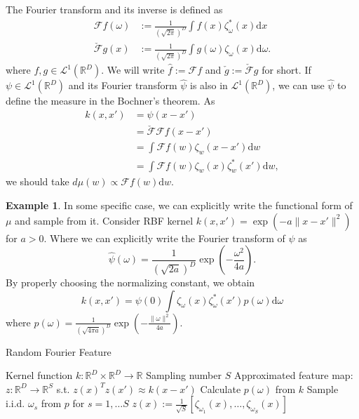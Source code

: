\documentclass{amsart}
\theoremstyle{definition}
\newtheorem{example}[theorem]{Example}
\theoremstyle{remark}
\numberwithin{equation}{section}
\begin{document}
The Fourier transform and its inverse is defined as
\begin{equation}
\begin{split}
\mathcal{F}f(\omega) &:= \frac{1}{(\sqrt{2\pi})^D}\int f(x) \zeta_\omega^{\ast}(x) \mathrm{d}x\\
\check{\mathcal{F}}g(x) &:= \frac{1}{(\sqrt{2\pi})^D}\int g(\omega) \zeta_\omega(x) \mathrm{d}\omega.
\end{split}
\end{equation}
where $f, g \in \mathcal{L}^{1}(\mathbb{R}^D)$.
We will write $\hat{f} := \mathcal{F}f$ and $\check{g}:=\check{\mathcal{F}}g$ for short.
If $\psi\in \mathcal{L}^{1}(\mathbb{R}^D)$ and its Fourier transform $\hat{\psi}$ is also in $\mathcal{L}^{1}(\mathbb{R}^D)$, we can use $\hat{\psi}$ to define the measure in the Bochner's theorem. As
\begin{equation}
\begin{split}
k(x, x') &= \psi(x-x')\\
&= \check{\mathcal{F}}\mathcal{F}f(x-x')\\
&= \int \mathcal{F}f(w) \zeta_{w}(x-x')\mathrm{d}w\\
&= \int \mathcal{F}f(w) \zeta_{w}(x) \zeta_{w}^{\ast}(x') \mathrm{d}w,
\end{split}
\end{equation}
we should take $d\mu(w) \propto \mathcal{F}f(w)\mathrm{d}w$.

\begin{example}
In some specific case, we can explicitly write the functional form of $\mu$ and sample from it.
Consider RBF kernel $k(x, x')=\exp(-a\|x-x'\|^2)$ for $a > 0$.
Where we can explicitly write the Fourier transform of $\psi$ as
\begin{equation}
\hat{\psi}(\omega) = \frac{1}{(\sqrt{2a})^D} \exp \left(-\frac{\omega^2}{4a}\right).
\end{equation}
By properly choosing the normalizing constant, we obtain
\begin{equation}
k(x, x') = \psi(0) \int \zeta_\omega(x)\zeta_\omega^{\ast}(x') p(\omega)\mathrm{d}\omega
\end{equation}
where $p(\omega) = \frac{1}{(\sqrt{4\pi a})^D}\exp\left(-\frac{\|\omega\|^2}{4a} \right)$.
\end{example}

\begin{algorithm}
\caption{Random Fourier Feature}
\begin{algorithmic}
\REQUIRE Kernel function $k: \mathbb{R}^D \times \mathbb{R}^D\to \mathbb{R}$
\REQUIRE Sampling number $S$
\ENSURE Approximated feature map: $z: \mathbb{R}^D\to \mathbb{R}^S$ s.t. $z(x)^Tz(x')\approx k(x-x')$
\STATE Calculate $p(\omega)$ from $k$
\STATE Sample i.i.d. $\omega_s$ from $p$ for $s=1, \ldots S$
\STATE $z(x) := \frac{1}{\sqrt{S}}[\zeta_{\omega_1}(x), \ldots, \zeta_{\omega_S}(x)]$
\end{algorithmic}
\end{algorithm}
\end{document}
